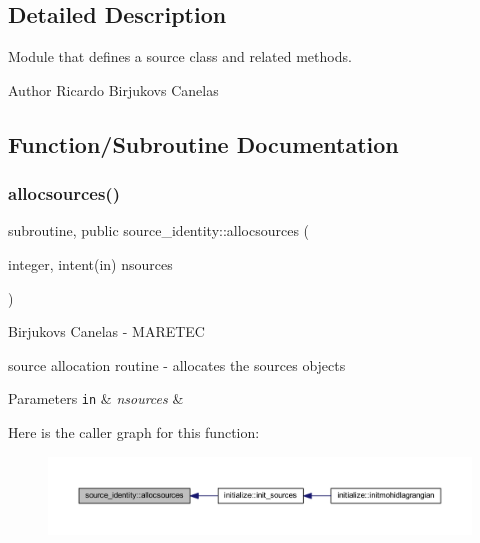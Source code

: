 \subsection{Detailed Description}
Module that defines a source class and related methods. 

\begin{DoxyAuthor}{Author}
Ricardo Birjukovs Canelas 
\end{DoxyAuthor}


\subsection{Function/\+Subroutine Documentation}
\mbox{\label{namespacesource__identity_a716b4cb4acec5756a6d4dcf20eee588e}} 
\subsubsection{\texorpdfstring{allocsources()}{allocsources()}}
{\footnotesize\ttfamily subroutine, public source\+\_\+identity\+::allocsources (\begin{DoxyParamCaption}\item[{integer, intent(in)}]{nsources }\end{DoxyParamCaption})}



Birjukovs Canelas -\/ M\+A\+R\+E\+T\+EC 

source allocation routine -\/ allocates the sources objects 
\begin{DoxyParams}[1]{Parameters}
\mbox{\tt in}  & {\em nsources} & \\
\hline
\end{DoxyParams}
Here is the caller graph for this function\+:\nopagebreak
\begin{figure}[H]
\begin{center}
\leavevmode
\includegraphics[width=350pt]{namespacesource__identity_a716b4cb4acec5756a6d4dcf20eee588e_icgraph}
\end{center}
\end{figure}
\mbox{\label{namespacesource__identity_a8d7aaa58c575f6ed78f5ca29d64615d7}} 
